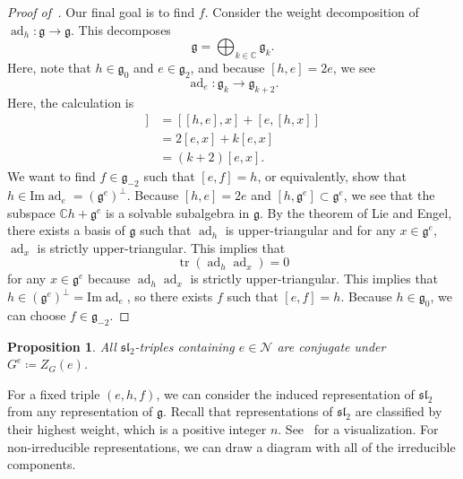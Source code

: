 \documentclass{amsart}
\newtheorem{prop}[thm]{Proposition}
\theoremstyle{definition}
\theoremstyle{remark}
\theoremstyle{plain}
\theoremstyle{definition}
\theoremstyle{remark}
\newcommand{\Ima}{\mathrm{Im}}
\newcommand{\C}{\mathbb{C}}
\newcommand{\g}{\mathfrak{g}}
\newcommand{\mc}[1]{\mathcal{#1}}
\newcommand{\mf}[1]{\mathfrak{#1}}
\newcommand{\on}[1]{\operatorname{#1}}
\newcommand{\1}{\mathbf{1}}
\newcommand{\2}{\mathbf{2}}
\newcommand{\3}{\mathbf{3}}
\renewcommand{\sl}{\mf{sl}}
\DeclareMathOperator{\ad}{ad}
\begin{document}
\begin{proof}[Proof of~]
    Our final goal is to find \(f\). Consider the weight decomposition of \(\ad_h \colon \g \to \g\). This decomposes
    \[ \g = \bigoplus_{k \in \C} \g_k. \]
    Here, note that \(h \in \g_0\) and \(e \in \g_2\), and because \([h,e] = 2e\), we see
    \[ \ad_e \colon \g_k \to \g_{k+2}. \]
    Here, the calculation is
    \begin{align*}
        [h, [e,x]] &= [[h,e], x] + [e, [h,x]] \\
        &= 2[e,x] + k[e,x] \\
        &= (k+2)[e,x].
    \end{align*}
    We want to find \(f \in \g_{-2}\) such that \([e,f] = h\), or equivalently, show that \(h \in \Ima \ad_e = (\g^e)^{\perp}\). Because \([h,e] = 2e\) and \([h, \g^e] \subset \g^e\), we see that the subspace \(\C h + \g^e\) is a solvable subalgebra in \(\g\). By the theorem of Lie and Engel, there exists a basis of \(\g\) such that \(\ad_h\) is upper-triangular and for any \(x \in \g^e\), \(\ad_x\) is strictly upper-triangular. This implies that
    \[ \on{tr} (\ad_h \ad_x) = 0 \]
    for any \(x \in \g^e\) because \(\ad_h \ad_x\) is strictly upper-triangular. This implies that \(h \in (\g^e)^{\perp} = \Ima \ad_e\), so there exists \(f\) such that \([e,f] = h\). Because \(h \in \g_0\), we can choose \(f \in \g_{-2}\).
\end{proof}

\begin{prop}\label{prop:sl2-triples-conjugate}
    All \(\sl_2\)-triples containing \(e \in \mc{N}\) are conjugate under \(G^e \coloneqq Z_G(e)\).
\end{prop}

For a fixed triple \((e,h,f)\), we can consider the induced representation of \(\sl_2\) from any representation of \(\g\). Recall that representations of \(\sl_2\) are classified by their highest weight, which is a positive integer \(n\). See~ for a visualization. For non-irreducible representations, we can draw a diagram with all of the irreducible components.
\end{document}
